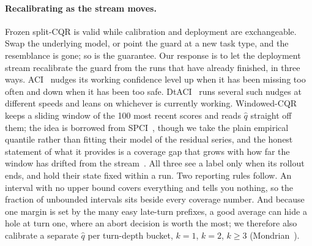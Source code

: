 \documentclass{article}
\begin{document}
\paragraph{Recalibrating as the stream moves.}
Frozen split-CQR is valid while calibration and deployment are exchangeable. Swap the underlying model, or point the guard at a new task type, and the resemblance is gone; so is the guarantee. Our response is to let the deployment stream recalibrate the guard from the runs that have already finished, in three ways. ACI~\cite{gibbs2021aci} nudges its working confidence level up when it has been missing too often and down when it has been too safe. DtACI~\cite{gibbs2024dtaci} runs several such nudges at different speeds and leans on whichever is currently working. Windowed-CQR keeps a sliding window of the 100 most recent scores and reads $\hat q$ straight off them; the idea is borrowed from SPCI~\cite{xu2023spci}, though we take the plain empirical quantile rather than fitting their model of the residual series, and the honest statement of what it provides is a coverage gap that grows with how far the window has drifted from the stream~\cite{barber2023beyond}. All three see a label only when its rollout ends, and hold their state fixed within a run. Two reporting rules follow. An interval with no upper bound covers everything and tells you nothing, so the fraction of unbounded intervals sits beside every coverage number. And because one margin is set by the many easy late-turn prefixes, a good average can hide a hole at turn one, where an abort decision is worth the most; we therefore also calibrate a separate $\hat q$ per turn-depth bucket, $k{=}1$, $k{=}2$, $k{\ge}3$ (Mondrian~\cite{vovk2012conditional}).
\end{document}
